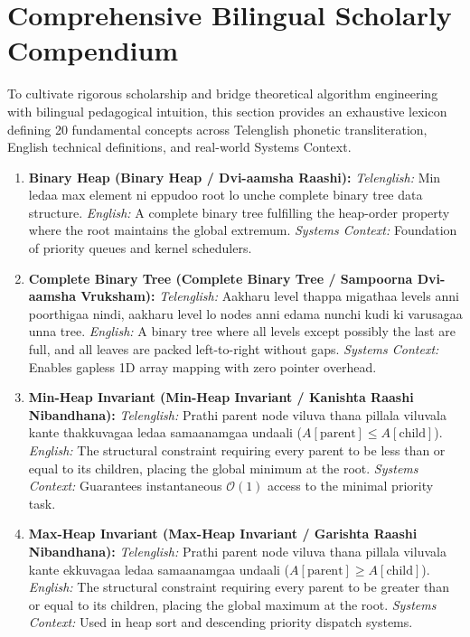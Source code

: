 \documentclass[10pt,twocolumn,letterpaper]{article}
\begin{document}
\section{Comprehensive Bilingual Scholarly Compendium}
\label{sec:bilingual}

To cultivate rigorous scholarship and bridge theoretical algorithm engineering with bilingual pedagogical intuition, this section provides an exhaustive lexicon defining 20 fundamental concepts across Telenglish phonetic transliteration, English technical definitions, and real-world Systems Context.

\begin{enumerate}
    \item \textbf{Binary Heap (Binary Heap / Dvi-aamsha Raashi):}
    \textit{Telenglish:} Min ledaa max element ni eppudoo root lo unche complete binary tree data structure.
    \textit{English:} A complete binary tree fulfilling the heap-order property where the root maintains the global extremum.
    \textit{Systems Context:} Foundation of priority queues and kernel schedulers.

    \item \textbf{Complete Binary Tree (Complete Binary Tree / Sampoorna Dvi-aamsha Vruksham):}
    \textit{Telenglish:} Aakharu level thappa migathaa levels anni poorthigaa nindi, aakharu level lo nodes anni edama nunchi kudi ki varusagaa unna tree.
    \textit{English:} A binary tree where all levels except possibly the last are full, and all leaves are packed left-to-right without gaps.
    \textit{Systems Context:} Enables gapless 1D array mapping with zero pointer overhead.

    \item \textbf{Min-Heap Invariant (Min-Heap Invariant / Kanishta Raashi Nibandhana):}
    \textit{Telenglish:} Prathi parent node viluva thana pillala viluvala kante thakkuvagaa ledaa samaanamgaa undaali ($A[\text{parent}] \le A[\text{child}]$).
    \textit{English:} The structural constraint requiring every parent to be less than or equal to its children, placing the global minimum at the root.
    \textit{Systems Context:} Guarantees instantaneous $\mathcal{O}(1)$ access to the minimal priority task.

    \item \textbf{Max-Heap Invariant (Max-Heap Invariant / Garishta Raashi Nibandhana):}
    \textit{Telenglish:} Prathi parent node viluva thana pillala viluvala kante ekkuvagaa ledaa samaanamgaa undaali ($A[\text{parent}] \ge A[\text{child}]$).
    \textit{English:} The structural constraint requiring every parent to be greater than or equal to its children, placing the global maximum at the root.
    \textit{Systems Context:} Used in heap sort and descending priority dispatch systems.


\end{enumerate}
\end{document}
